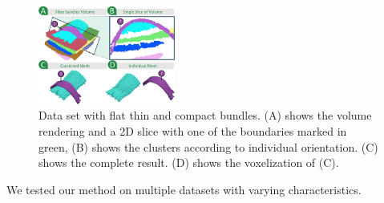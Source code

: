 \begin{figure}[tb]
\centering
	\includegraphics[width=0.4\textwidth, trim = 0mm 30mm 0mm 0mm, clip,]{images_pvis/figure8}
	\caption{Data set with flat thin and compact bundles. (A) shows the volume rendering and a 2D slice with one of the boundaries marked in green, (B) shows the clusters according to individual orientation. (C) shows the complete result. (D) shows the voxelization of (C).}
	\label{fig:prepreg}
\end{figure}


We tested our method on multiple datasets with varying characteristics. 

